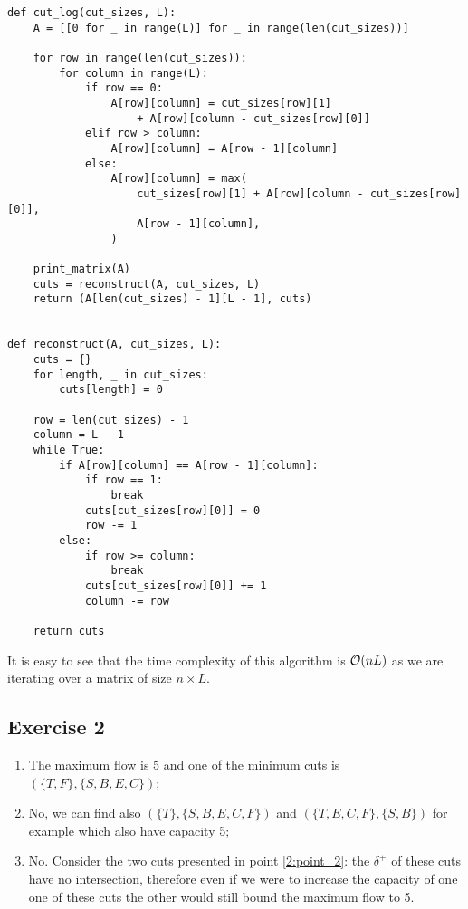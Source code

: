 \documentclass[12pt]{extarticle}
\begin{document}
\begin{verbatim}
def cut_log(cut_sizes, L):
    A = [[0 for _ in range(L)] for _ in range(len(cut_sizes))]

    for row in range(len(cut_sizes)):
        for column in range(L):
            if row == 0:
                A[row][column] = cut_sizes[row][1] 
                    + A[row][column - cut_sizes[row][0]]
            elif row > column:
                A[row][column] = A[row - 1][column]
            else:
                A[row][column] = max(
                    cut_sizes[row][1] + A[row][column - cut_sizes[row][0]],
                    A[row - 1][column],
                )

    print_matrix(A)
    cuts = reconstruct(A, cut_sizes, L)
    return (A[len(cut_sizes) - 1][L - 1], cuts)


def reconstruct(A, cut_sizes, L):
    cuts = {}
    for length, _ in cut_sizes:
        cuts[length] = 0

    row = len(cut_sizes) - 1
    column = L - 1
    while True:
        if A[row][column] == A[row - 1][column]:
            if row == 1:
                break
            cuts[cut_sizes[row][0]] = 0
            row -= 1
        else:
            if row >= column:
                break
            cuts[cut_sizes[row][0]] += 1
            column -= row

    return cuts
\end{verbatim}

It is easy to see that the time complexity of this algorithm is $\mathcal{O}(nL)$ as we are iterating over a matrix of size $n \times L$.

\subsection*{Exercise 2}

\begin{enumerate}
    \item The maximum flow is 5 and one of the minimum cuts is $\left(\{T, F\}, \{S, B, E, C\}\right)$;
    \item No, we can find also $\left(\{T\}, \{S, B, E, C,F\}\right)$ and $\left(\{T,  E, C,F\}, \{S, B\}\right)$ for example which also have capacity 5; \label{2:point_2}
    \item No. Consider the two cuts presented in point \ref{2:point_2}: the $\delta^+$ of these cuts have no intersection, therefore even if we were to increase the capacity of one one of these cuts the other would still bound the maximum flow to 5.
\end{enumerate}
\end{document}
